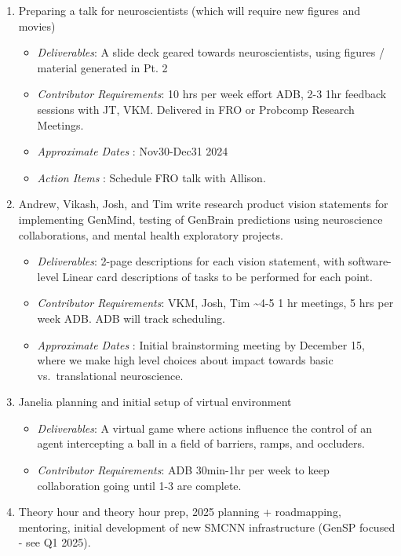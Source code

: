 \documentclass[
  letterpaper,
  DIV=11,
  numbers=noendperiod]{scrartcl}
\providecommand{\tightlist}{%
  \setlength{\itemsep}{0pt}\setlength{\parskip}{0pt}}\usepackage{longtable,booktabs,array}
\begin{document}
\begin{enumerate}
  \begin{itemize}
  \tightlist
  \item
    \emph{Deliverables}: Manuscript with updated figures
  \item
    \emph{Contributor Requirements}: 15 hrs per week ADB, 5 hrs per week
    GM. 2-3 hours editing and feedback from JT, JD, VKM, CR.
  \item
    \emph{Approximate Dates} : Nov15-Dec31 2024
  \end{itemize}
\item
  Preparing a talk for neuroscientists (which will require new figures
  and movies)

  \begin{itemize}
  \tightlist
  \item
    \emph{Deliverables}: A slide deck geared towards neuroscientists,
    using figures / material generated in Pt. 2
  \item
    \emph{Contributor Requirements}: 10 hrs per week effort ADB, 2-3 1hr
    feedback sessions with JT, VKM. Delivered in FRO or Probcomp
    Research Meetings.
  \item
    \emph{Approximate Dates} : Nov30-Dec31 2024
  \item
    \emph{Action Items} : Schedule FRO talk with Allison.
  \end{itemize}
\item
  Andrew, Vikash, Josh, and Tim write research product vision statements
  for implementing GenMind, testing of GenBrain predictions using
  neuroscience collaborations, and mental health exploratory projects.

  \begin{itemize}
  \tightlist
  \item
    \emph{Deliverables}: 2-page descriptions for each vision statement,
    with software-level Linear card descriptions of tasks to be
    performed for each point.
  \item
    \emph{Contributor Requirements}: VKM, Josh, Tim \textasciitilde4-5 1
    hr meetings, 5 hrs per week ADB. ADB will track scheduling.
  \item
    \emph{Approximate Dates} : Initial brainstorming meeting by December
    15, where we make high level choices about impact towards basic
    vs.~translational neuroscience.
  \end{itemize}
\item
  Janelia planning and initial setup of virtual environment

  \begin{itemize}
  \tightlist
  \item
    \emph{Deliverables}: A virtual game where actions influence the
    control of an agent intercepting a ball in a field of barriers,
    ramps, and occluders.
  \item
    \emph{Contributor Requirements}: ADB 30min-1hr per week to keep
    collaboration going until 1-3 are complete.
  \end{itemize}
\item
  Theory hour and theory hour prep, 2025 planning + roadmapping,
  mentoring, initial development of new SMCNN infrastructure (GenSP
  focused - see Q1 2025).


\end{enumerate}
\end{document}
